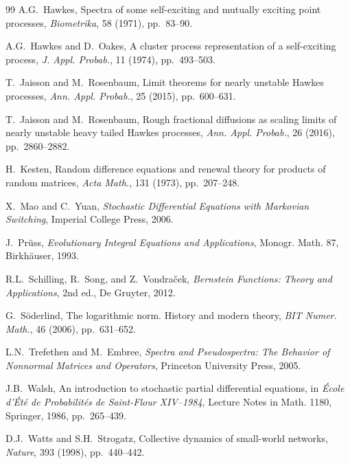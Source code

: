 \documentclass[11pt]{article}
\theoremstyle{plain}
\theoremstyle{definition}
\theoremstyle{remark}
\begin{document}
\begin{thebibliography}{99}
 A.G.~Hawkes,
Spectra of some self-exciting and mutually exciting point processes,
\emph{Biometrika}, 58 (1971), pp.~83--90.

 A.G.~Hawkes and D.~Oakes,
A cluster process representation of a self-exciting process,
\emph{J. Appl. Probab.}, 11 (1974), pp.~493--503.

 T.~Jaisson and M.~Rosenbaum,
Limit theorems for nearly unstable Hawkes processes,
\emph{Ann. Appl. Probab.}, 25 (2015), pp.~600--631.

 T.~Jaisson and M.~Rosenbaum,
Rough fractional diffusions as scaling limits of nearly unstable heavy tailed Hawkes processes,
\emph{Ann. Appl. Probab.}, 26 (2016), pp.~2860--2882.

 H.~Kesten,
Random difference equations and renewal theory for products of random matrices,
\emph{Acta Math.}, 131 (1973), pp.~207--248.

 X.~Mao and C.~Yuan,
\emph{Stochastic Differential Equations with Markovian Switching}, Imperial College Press, 2006.

 J.~Pr\"uss,
\emph{Evolutionary Integral Equations and Applications}, Monogr. Math. 87, Birkh\"auser, 1993.

 R.L.~Schilling, R.~Song, and Z.~Vondra\v{c}ek,
\emph{Bernstein Functions: Theory and Applications}, 2nd ed., De Gruyter, 2012.

 G.~S\"oderlind,
The logarithmic norm. History and modern theory,
\emph{BIT Numer. Math.}, 46 (2006), pp.~631--652.

 L.N.~Trefethen and M.~Embree,
\emph{Spectra and Pseudospectra: The Behavior of Nonnormal Matrices and Operators},
Princeton University Press, 2005.

 J.B.~Walsh,
An introduction to stochastic partial differential equations,
in \emph{\'Ecole d'\'Et\'e de Probabilit\'es de Saint-Flour XIV--1984}, Lecture Notes in Math. 1180,
Springer, 1986, pp.~265--439.

 D.J.~Watts and S.H.~Strogatz,
Collective dynamics of small-world networks,
\emph{Nature}, 393 (1998), pp.~440--442.

\end{thebibliography}
\end{document}

